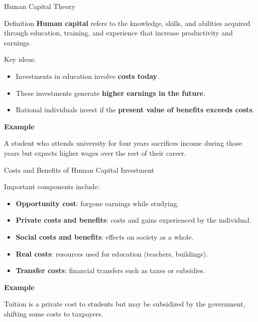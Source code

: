 \documentclass[aspectratio=169]{beamer}
\begin{document}
\begin{frame}{Human Capital Theory}
\begin{block}{Definition}
\textbf{Human capital} refers to the knowledge, skills, and abilities acquired through education, training, and experience that increase productivity and earnings.
\end{block}

Key ideas:

\begin{itemize}
\item Investments in education involve \textbf{costs today}.
\item These investments generate \textbf{higher earnings in the future}.
\item Rational individuals invest if the \textbf{present value of benefits exceeds costs}.
\end{itemize}

\textbf{Example}

A student who attends university for four years sacrifices income during those years but expects higher wages over the rest of their career.
\end{frame}

\begin{frame}{Costs and Benefits of Human Capital Investment}

Important components include:

\begin{itemize}
\item \textbf{Opportunity cost}: forgone earnings while studying.
\item \textbf{Private costs and benefits}: costs and gains experienced by the individual.
\item \textbf{Social costs and benefits}: effects on society as a whole.
\item \textbf{Real costs}: resources used for education (teachers, buildings).
\item \textbf{Transfer costs}: financial transfers such as taxes or subsidies.
\end{itemize}

\textbf{Example}

Tuition is a private cost to students but may be subsidized by the government, shifting some costs to taxpayers.
\end{frame}
\end{document}
